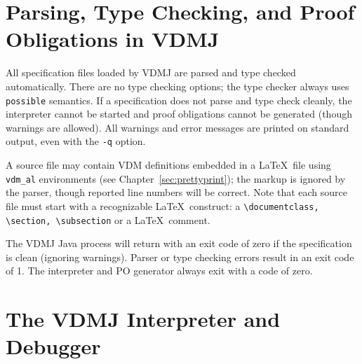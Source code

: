\documentclass{overturerepchap}
\begin{document}


\section{Parsing, Type Checking, and Proof Obligations in VDMJ}

All specification files loaded by VDMJ are parsed and type checked
automatically. There are no type checking options; the type checker
always uses \texttt{possible} semantics. If a specification does not parse
and type check cleanly, the interpreter cannot be started and proof
obligations cannot be generated (though warnings are allowed). All
warnings and error messages are printed on standard output, even
with the \texttt{-q} option.

A source file may contain VDM definitions embedded
in a \LaTeX\ file using \verb|vdm_al| environments (see
Chapter~\ref{sec:prettyprint}); the markup is ignored by the parser,
though reported line numbers will be correct. Note that each source file
must start with a recognizable \LaTeX\ construct:
a \verb+\documentclass, \section, \subsection+ or a \LaTeX\ comment.

The VDMJ Java process will return with an exit code of zero if the
specification is clean (ignoring warnings). Parser or type checking
errors result in an exit code of 1. The interpreter and PO generator
always exit with a code of zero.

\section{The VDMJ Interpreter and Debugger}\label{sec:commandlineinterpreter}
\end{document}
